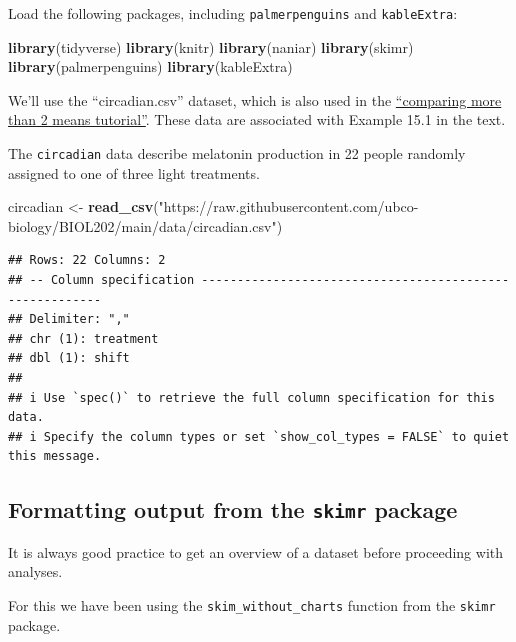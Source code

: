 \documentclass[
]{book}
\newenvironment{Shaded}{\begin{snugshade}}{\end{snugshade}}
\newcommand{\FunctionTok}[1]{\textcolor[rgb]{0.13,0.29,0.53}{\textbf{#1}}}
\newcommand{\NormalTok}[1]{#1}
\newcommand{\OtherTok}[1]{\textcolor[rgb]{0.56,0.35,0.01}{#1}}
\newcommand{\StringTok}[1]{\textcolor[rgb]{0.31,0.60,0.02}{#1}}
\begin{document}
Load the following packages, including \texttt{palmerpenguins} and \texttt{kableExtra}:

\begin{Shaded}
\begin{Highlighting}[]
\FunctionTok{library}\NormalTok{(tidyverse)}
\FunctionTok{library}\NormalTok{(knitr)}
\FunctionTok{library}\NormalTok{(naniar)}
\FunctionTok{library}\NormalTok{(skimr)}
\FunctionTok{library}\NormalTok{(palmerpenguins)}
\FunctionTok{library}\NormalTok{(kableExtra)}
\end{Highlighting}
\end{Shaded}

We'll use the ``circadian.csv'' dataset, which is also used in the \hyperref[compare_three_more_means]{``comparing more than 2 means tutorial''}. These data are associated with Example 15.1 in the text.

The \texttt{circadian} data describe melatonin production in 22 people randomly assigned to one of three light treatments.

\begin{Shaded}
\begin{Highlighting}[]
\NormalTok{circadian }\OtherTok{\textless{}{-}} \FunctionTok{read\_csv}\NormalTok{(}\StringTok{"https://raw.githubusercontent.com/ubco{-}biology/BIOL202/main/data/circadian.csv"}\NormalTok{)}
\end{Highlighting}
\end{Shaded}

\begin{verbatim}
## Rows: 22 Columns: 2
## -- Column specification --------------------------------------------------------
## Delimiter: ","
## chr (1): treatment
## dbl (1): shift
## 
## i Use `spec()` to retrieve the full column specification for this data.
## i Specify the column types or set `show_col_types = FALSE` to quiet this message.
\end{verbatim}

\subsection{\texorpdfstring{Formatting output from the \texttt{skimr} package}{Formatting output from the skimr package}}\label{skim_tables}

It is always good practice to get an overview of a dataset before proceeding with analyses.

For this we have been using the \texttt{skim\_without\_charts} function from the \texttt{skimr} package.
\end{document}
